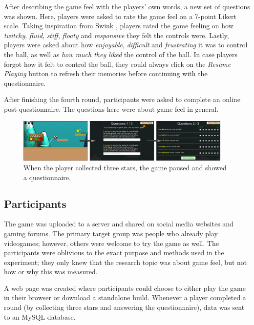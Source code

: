 After describing the game feel with the players' own words, a new set of questions was shown. Here, players were asked to rate the game feel on a 7-point Likert scale. Taking inspiration from Swink \cite{swink}, players rated the game feeling on how \textit{twitchy}, \textit{fluid}, \textit{stiff}, \textit{floaty} and \textit{responsive} they felt the controls were. Lastly, players were asked about how \textit{enjoyable}, \textit{difficult} and \textit{frustrating} it was to control the ball, as well as \textit{how much they liked} the control of the ball. In case players forgot how it felt to control the ball, they could always click on the \textit{Resume Playing} button to refresh their memories before continuing with the questionnaire.

After finishing the fourth round, participants were asked to complete an online post-questionnaire. The questions here were about game feel in general.

\begin{figure}[htbp]
\centering
\includegraphics[width=0.95\textwidth]{Pics/game_phases}
\caption{When the player collected three stars, the game paused and showed a questionnaire.}
\label{fig:questionnaire}
\end{figure}

\subsection{Participants}
The game was uploaded to a server and shared on social media websites and gaming forums. The primary target group was people who already play videogames; however, others were welcome to try the game as well. The participants were oblivious to the exact purpose and methods used in the experiment; they only knew that the research topic was about game feel, but not how or why this was measured.

A web page was created where participants could choose to either play the game in their browser or download a standalone build. Whenever a player completed a round (by collecting three stars and answering the questionnaire), data was sent to an MySQL database.



